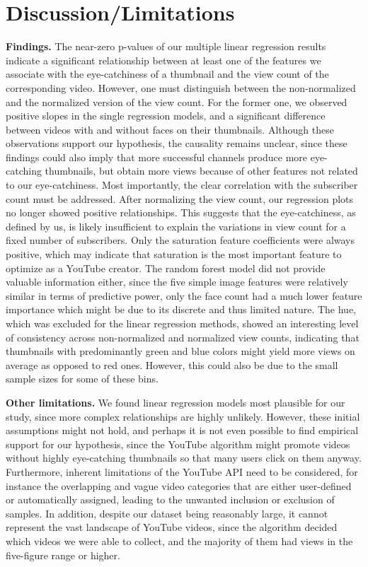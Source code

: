 \documentclass{article}
\begin{document}
\section{Discussion/Limitations}
\textbf{Findings.} The near-zero p-values of our multiple linear regression results indicate a significant relationship between at least one of the features we associate with the eye-catchiness of a thumbnail and the view count of the corresponding video. However, one must distinguish between the non-normalized and the normalized version of the view count. For the former one, we observed positive slopes in the single regression models, and a significant difference between videos with and without faces on their thumbnails. Although these observations support our hypothesis, the causality remains unclear, since these findings could also imply that more successful channels produce more eye-catching thumbnails, but obtain more views because of other features not related to our eye-catchiness. Most importantly, the clear correlation with the subscriber count must be addressed. After normalizing the view count, our regression plots no longer showed positive relationships. This suggests that the eye-catchiness, as defined by us, is likely insufficient to explain the variations in view count for a fixed number of subscribers. Only the saturation feature coefficients were always positive, which may indicate that saturation is the most important feature to optimize as a YouTube creator. The random forest model did not provide valuable information either, since the five simple image features were relatively similar in terms of predictive power, only the face count had a much lower feature importance which might be due to its discrete and thus limited nature. The hue, which was excluded for the linear regression methods, showed an interesting level of consistency across non-normalized and normalized view counts, indicating that thumbnails with predominantly green and blue colors might yield more views on average as opposed to red ones. However, this could also be due to the small sample sizes for some of these bins.

\textbf{Other limitations.} We found linear regression models most plausible for our study, since more complex relationships are highly unlikely. However, these initial assumptions might not hold, and perhaps it is not even possible to find empirical support for our hypothesis, since the YouTube algorithm might promote videos without highly eye-catching thumbnails so that many users click on them anyway. Furthermore, inherent limitations of the YouTube API need to be considered, for instance the overlapping and vague video categories that are either user-defined or automatically assigned, leading to the unwanted inclusion or exclusion of samples. In addition, despite our dataset being reasonably large, it cannot represent the vast landscape of YouTube videos, since the algorithm decided which videos we were able to collect, and the majority of them had views in the five-figure range or higher.
\end{document}
